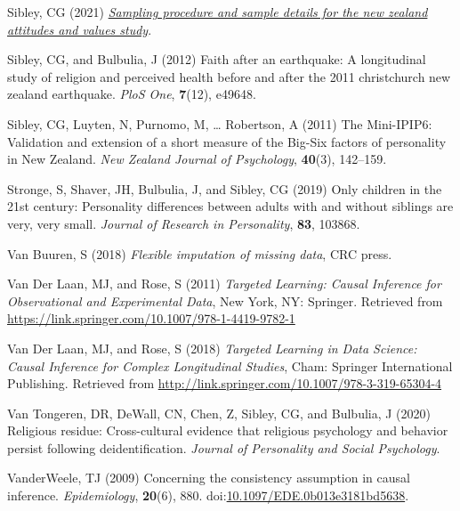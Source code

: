 \documentclass[
  singlecolumn]{article}
\newlength{\cslhangindent}
\newenvironment{CSLReferences}[2] %
 {\begin{list}{}{%
  \setlength{\itemindent}{0pt}
  \setlength{\leftmargin}{0pt}
  \setlength{\parsep}{0pt}
  \ifodd #1
   \setlength{\leftmargin}{\cslhangindent}
   \setlength{\itemindent}{-1\cslhangindent}
  \fi
  \setlength{\itemsep}{#2\baselineskip}}}
 {\end{list}}
\begin{document}
\begin{CSLReferences}{1}{0}
Sibley, CG (2021)
\emph{\href{https://doi.org/10.31234/osf.io/wgqvy}{Sampling procedure
and sample details for the new zealand attitudes and values study}}.

Sibley, CG, and Bulbulia, J (2012) Faith after an earthquake: A
longitudinal study of religion and perceived health before and after the
2011 christchurch new zealand earthquake. \emph{PloS One},
\textbf{7}(12), e49648.

Sibley, CG, Luyten, N, Purnomo, M, \ldots{} Robertson, A (2011) The
Mini-IPIP6: Validation and extension of a short measure of the Big-Six
factors of personality in New Zealand. \emph{New Zealand Journal of
Psychology}, \textbf{40}(3), 142--159.

Stronge, S, Shaver, JH, Bulbulia, J, and Sibley, CG (2019) Only children
in the 21st century: Personality differences between adults with and
without siblings are very, very small. \emph{Journal of Research in
Personality}, \textbf{83}, 103868.

Van Buuren, S (2018) \emph{Flexible imputation of missing data}, CRC
press.

Van Der Laan, MJ, and Rose, S (2011) \emph{Targeted Learning: Causal
Inference for Observational and Experimental Data}, New York, NY:
Springer. Retrieved from
\url{https://link.springer.com/10.1007/978-1-4419-9782-1}

Van Der Laan, MJ, and Rose, S (2018) \emph{Targeted Learning in Data
Science: Causal Inference for Complex Longitudinal Studies}, Cham:
Springer International Publishing. Retrieved from
\url{http://link.springer.com/10.1007/978-3-319-65304-4}

Van Tongeren, DR, DeWall, CN, Chen, Z, Sibley, CG, and Bulbulia, J
(2020) Religious residue: Cross-cultural evidence that religious
psychology and behavior persist following deidentification.
\emph{Journal of Personality and Social Psychology}.

VanderWeele, TJ (2009) Concerning the consistency assumption in causal
inference. \emph{Epidemiology}, \textbf{20}(6), 880.
doi:\href{https://doi.org/10.1097/EDE.0b013e3181bd5638}{10.1097/EDE.0b013e3181bd5638}.


\end{CSLReferences}
\end{document}
